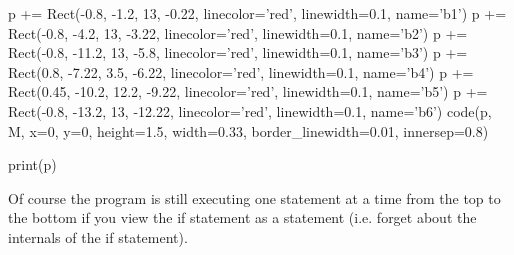 \begin{python}
p += Rect(-0.8, -1.2, 13, -0.22, linecolor='red', linewidth=0.1, name='b1')
p += Rect(-0.8, -4.2, 13, -3.22, linecolor='red', linewidth=0.1, name='b2')
p += Rect(-0.8, -11.2, 13, -5.8, linecolor='red', linewidth=0.1, name='b3')
p += Rect(0.8, -7.22, 3.5, -6.22, linecolor='red', linewidth=0.1, name='b4')
p += Rect(0.45, -10.2, 12.2, -9.22, linecolor='red', linewidth=0.1, name='b5')
p += Rect(-0.8, -13.2, 13, -12.22, linecolor='red', linewidth=0.1, name='b6')
code(p, M, x=0, y=0, height=1.5, width=0.33, border_linewidth=0.01, innersep=0.8)

print(p)
\end{python}

Of course the program is still executing one statement at a time from
the top to the bottom if you view the if statement as a statement (i.e.
forget about the internals of the if statement).

